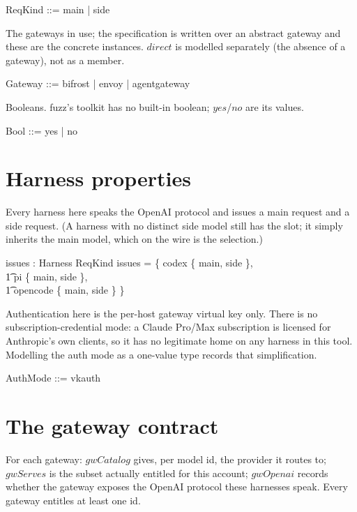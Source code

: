 \documentclass{article}
\begin{document}
\begin{zed}
  ReqKind ::= main | side
\end{zed}

The gateways in use; the specification is written over an abstract gateway and
these are the concrete instances. $direct$ is modelled separately (the absence
of a gateway), not as a member.

\begin{zed}
  Gateway ::= bifrost | envoy | agentgateway
\end{zed}

Booleans. fuzz's toolkit has no built-in boolean; $yes$/$no$ are its values.

\begin{zed}
  Bool ::= yes | no
\end{zed}

\section{Harness properties}

Every harness here speaks the OpenAI protocol and issues a main request and a
side request. (A harness with no distinct side model still has the slot; it
simply inherits the main model, which on the wire is the selection.)

\begin{axdef}
  issues : Harness \fun \power ReqKind
\where
  issues = \{ codex \mapsto \{ main, side \}, \\
  \t1         pi \mapsto \{ main, side \}, \\
  \t1         opencode \mapsto \{ main, side \} \}
\end{axdef}

Authentication here is the per-host gateway virtual key only. There is no
subscription-credential mode: a Claude Pro/Max subscription is licensed for
Anthropic's own clients, so it has no legitimate home on any harness in this
tool. Modelling the auth mode as a one-value type records that simplification.

\begin{zed}
  AuthMode ::= vkauth
\end{zed}

\section{The gateway contract}

For each gateway: $gwCatalog$ gives, per model id, the provider it routes to;
$gwServes$ is the subset actually entitled for this account; $gwOpenai$ records
whether the gateway exposes the OpenAI protocol these harnesses speak. Every
gateway entitles at least one id.
\end{document}
